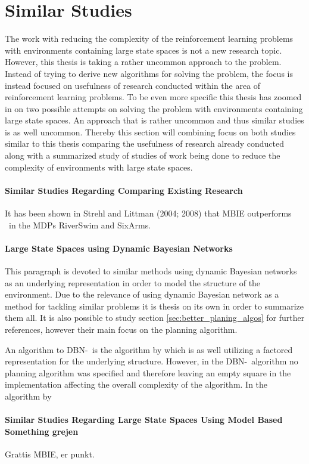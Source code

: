 \section{Similar Studies }
The work with reducing the complexity of the reinforcement learning problems with environments containing large state spaces is not a new research topic. However, this thesis is taking a rather uncommon approach to the problem. Instead of trying to derive new algorithms for solving the problem, the focus is instead focused on usefulness of research conducted within the area of reinforcement learning problems. To be even more specific this thesis has zoomed in on two possible attempts on solving the problem with environments containing large state spaces. An approach that is rather uncommon and thus similar studies is as well uncommon. 
Thereby this section will combining focus on both studies similar to this thesis comparing the usefulness of research already conducted along with a summarized study of studies of work being done to reduce the complexity of environments with large state spaces.


\paragraph{Similar Studies Regarding Comparing Existing Research}
It has been shown in Strehl and Littman (2004; 2008) that MBIE outperforms \etre\ in the MDPs RiverSwim and SixArms. \parencite{dietterich2013pac}


\paragraph{Large State Spaces using Dynamic Bayesian Networks}
This paragraph is devoted to similar methods using dynamic Bayesian networks as an underlying representation in order to model the structure of the environment. Due to the relevance of using dynamic Bayesian network as a method for tackling similar problems it is thesis on its own in order to summarize them all. It is also possible to study section \ref{sec:better_planing_algos} for further references, however their main focus on the planning algorithm.

An algorithm to DBN-\etre\ is the algorithm by \textcite{ross2012model} which is as well utilizing a factored representation for the underlying structure. However, in the DBN-\etre\ algorithm no planning algorithm was specified and therefore leaving an empty square in the implementation affecting the overall complexity of the algorithm. In the algorithm by \textcite{ross2012model} 


\paragraph{Similar Studies Regarding Large State Spaces Using Model Based Something grejen}
Grattis MBIE, er punkt.